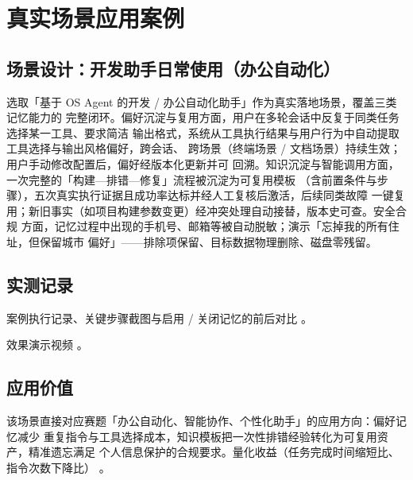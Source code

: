 \section{真实场景应用案例}\label{sec:case}

\subsection{场景设计：开发助手日常使用（办公自动化）}

选取「基于 OS Agent 的开发 / 办公自动化助手」作为真实落地场景，覆盖三类记忆能力的
完整闭环。偏好沉淀与复用方面，用户在多轮会话中反复于同类任务选择某一工具、要求简洁
输出格式，系统从工具执行结果与用户行为中自动提取工具选择与输出风格偏好，跨会话、
跨场景（终端场景 / 文档场景）持续生效；用户手动修改配置后，偏好经版本化更新并可
回溯。知识沉淀与智能调用方面，一次完整的「构建—排错—修复」流程被沉淀为可复用模板
（含前置条件与步骤），五次真实执行证据且成功率达标并经人工复核后激活，后续同类故障
一键复用；新旧事实（如项目构建参数变更）经冲突处理自动接替，版本史可查。安全合规
方面，记忆过程中出现的手机号、邮箱等被自动脱敏；演示「忘掉我的所有住址，但保留城市
偏好」——排除项保留、目标数据物理删除、磁盘零残留。

\subsection{实测记录}

案例执行记录、关键步骤截图与启用 / 关闭记忆的前后对比 。

效果演示视频 。

\subsection{应用价值}

该场景直接对应赛题「办公自动化、智能协作、个性化助手」的应用方向：偏好记忆减少
重复指令与工具选择成本，知识模板把一次性排错经验转化为可复用资产，精准遗忘满足
个人信息保护的合规要求。量化收益（任务完成时间缩短比、指令次数下降比）
。

